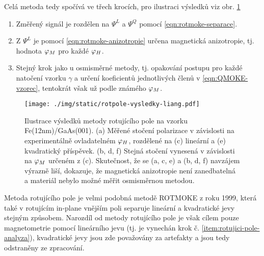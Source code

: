 Celá metoda tedy spočívá ve třech krocích, pro ilustraci výsledků viz obr. \ref{fig:metoda-rotujiciho-pole-vysledky}
\begin{enumerate}
    \item Změřený signál je rozdělen na $\Psi^L$ a $\Psi^Q$ pomocí \eqref{eqn:rotmoke-separace}.
    \item Z $\Psi^L$ je pomocí \eqref{eqn:rotmoke-anizotropie} určena magnetická anizotropie, tj. hodnota $\varphi_M$ pro každé $\varphi_H$.
    \item Stejný krok jako u osmisměrné metody, tj. opakování postupu pro každé natočení vzorku $\gamma$ a určení koeficientů jednotlivých členů v \eqref{eqn:QMOKE-vzorec}, tentokrát však už podle známého $\varphi_M$. \label{item:rotujici-pole-analyza}
\end{enumerate}

\begin{figure}[htbp]
    \centering
    \texttt{[image: ./img/static/rotpole-vysledky-liang.pdf]}
    \caption{Ilustrace výsledků metody rotujícího pole na vzorku Fe(12nm)/GaAs(001).
    (a) Měřené stočení polarizace v závislosti na experimentálně ovladatelném $\varphi_H$, rozdělené na (c) lineární a (e) kvadratický příspěvek. (b, d, f) Stejná stočení vynesená v závislosti na $\varphi_M$ určeném z (c). 
    Skutečnost, že se (a, c, e) a (b, d, f) navzájem výrazně liší, dokazuje, že magnetická anizotropie není zanedbatelná a materiál nebylo možné měřit osmisměrnou metodou. \cite{liangSeparationLinearQuadratic2015}}
    \label{fig:metoda-rotujiciho-pole-vysledky}
\end{figure}

Metoda rotujícího pole je velmi podobná metodě ROTMOKE\cite{mattheisDeterminationAnisotropyField1999} z roku 1999, která také v rotujícím in-plane vnějším poli separuje lineární a kvadratické jevy stejným způsobem.
Narozdíl od metody rotujícího pole je však cílem pouze magnetometrie pomocí lineárního jevu (tj. je vynechán krok č. \ref{item:rotujici-pole-analyza}), kvadratické jevy jsou zde považovány za artefakty a jsou tedy odstraněny ze zpracování.
